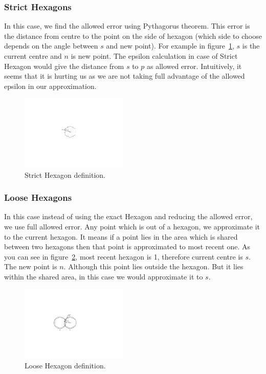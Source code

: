 \documentclass[conference]{IEEEtran}
\begin{document}
\subsubsection{Strict Hexagons}
In this case, we find the allowed error using Pythagorus theorem. This error is the distance from centre to the point on the side of hexagon (which side to choose depends on the angle between $s$ and new point). For example in figure~\ref{fig:strict-hexagon}, $s$ is the current centre and $n$ is new point. The epsilon calculation in case of Strict Hexagon would give the distance from $s$ to $p$ as allowed error. Intuitively, it seems that it is hurting us as we are not taking full advantage of the allowed epsilon in our approximation.
\begin{figure}[ht]
  \centering
  \includegraphics[width=2in]{images/strict-hexagon.pdf}
  \caption {Strict Hexagon definition.}
  \label{fig:strict-hexagon}
\end{figure}
\subsubsection{Loose Hexagons}
In this case instead of using the exact Hexagon and reducing the allowed error, we use full allowed error. Any point which is out of a hexagon, we approximate it to the current hexagon. It means if a point lies in the area which is shared between two hexagons then that point is approximated to most recent one. As you can see in figure~\ref{fig:loose-hexagon}, most recent hexagon is 1, therefore current centre is $s$. The new point is $n$. Although this point lies outside the hexagon. But it lies within the shared area, in this case we would approximate it to $s$.
\begin{figure}[ht]
  \centering
  \includegraphics[width=2in]{images/loose-hexagon-shared.pdf}
  \caption {Loose Hexagon definition.}
  \label{fig:loose-hexagon}
\end{figure}
\end{document}
